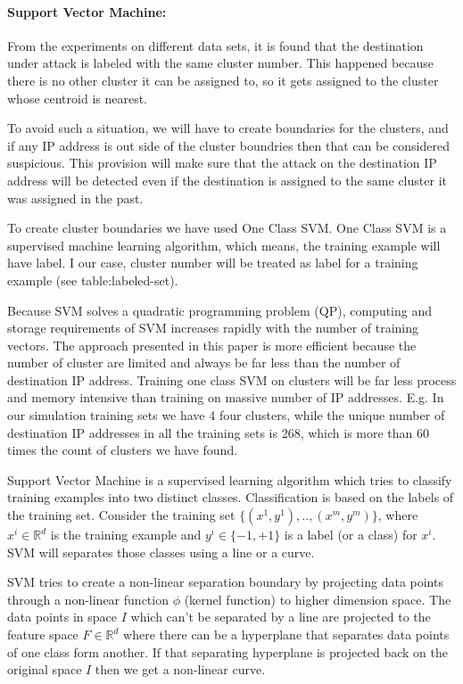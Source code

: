 \documentclass[12pt,oneside,a4paper]{article}
\begin{document}
\paragraph{Support Vector Machine:}

From the experiments on different data sets, it is found that the destination under attack is labeled with the same cluster number. This happened because there is no other cluster it can be assigned to, so it gets assigned to the cluster whose centroid is nearest.

To avoid such a situation, we will have to create boundaries for the clusters, and if any IP address is out side of the cluster boundries then that can be considered suspicious. This provision will make sure that the attack on the destination IP address will be detected even if the destination is assigned to the same cluster it was assigned in the past.

To create cluster boundaries we have used One Class SVM. One Class SVM is a supervised machine learning algorithm, which means, the training example will have label. I our case, cluster number will be treated as label for a training example (see table:labeled-set).

Because SVM solves a quadratic programming problem (QP), computing and storage requirements of SVM increases rapidly with the number of training vectors. The approach presented in this paper is more efficient because the number of cluster are limited and always be far less than the number of destination IP address. Training one class SVM on clusters will be far less process and memory intensive than training on massive number of IP addresses. E.g. In our simulation training sets we have 4 four clusters, while the unique number of destination IP addresses in all the training sets is 268, which is more than 60 times the count of clusters we have found.

Support Vector Machine is a supervised learning algorithm which tries to classify training examples into two distinct classes. Classification is based on the labels of the training set.
Consider the training set $\{(x^{1},y^{1}), .., (x^{m},y^{m})\}$, where $x^{i} \in \mathbb{R}^d$ is the training example and $y^{i} \in \{-1, +1\}$ is a label (or a class) for $x^{i}$. SVM will separates those classes using a line or a curve.

SVM tries to create a non-linear separation boundary by projecting data points through a non-linear function $\phi$ (kernel function) to higher dimension space. The data points in space $I$ which can't be separated by a line are projected to the feature space $F \in \mathbb{R}^d$ where there can be a hyperplane that separates data points of one class form another. If that separating hyperplane is projected back on the original space $I$ then we get a non-linear curve.\cite{svm}
\end{document}
